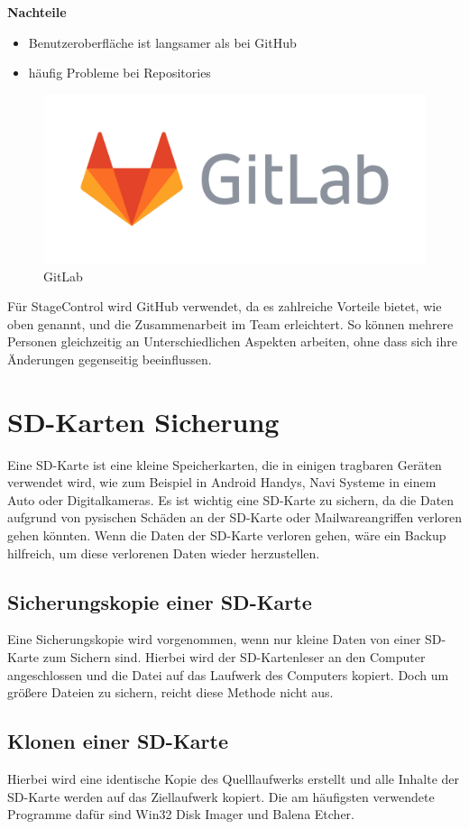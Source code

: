 \textbf{Nachteile}
\begin{itemize}
	\item Benutzeroberfläche ist langsamer als bei GitHub
	\item häufig Probleme bei Repositories 
\end{itemize}


\begin{figure}[H]
	\centering
	\includegraphics[width=0.5\linewidth]{images/GitLab.png}
	\caption[GitLab]{GitLab}
	\label{fig:GitLab}
\end{figure}

Für StageControl wird GitHub verwendet, da es zahlreiche Vorteile bietet, wie oben genannt, und die Zusammenarbeit im Team erleichtert. So können mehrere Personen gleichzeitig an Unterschiedlichen Aspekten arbeiten, ohne dass sich ihre Änderungen gegenseitig beeinflussen.

\section{SD-Karten Sicherung}
Eine SD-Karte ist eine kleine Speicherkarten, die in einigen tragbaren Geräten verwendet wird, wie zum Beispiel in Android Handys, Navi Systeme in einem Auto oder Digitalkameras. Es ist wichtig eine SD-Karte zu sichern, da die Daten aufgrund von pysischen Schäden an der SD-Karte oder Mailwareangriffen verloren gehen könnten. Wenn die Daten der SD-Karte verloren gehen, wäre ein Backup hilfreich, um diese verlorenen Daten wieder herzustellen.  \parencite{SD-KartenSicherung}

\subsection{Sicherungskopie einer SD-Karte}
Eine Sicherungskopie wird vorgenommen, wenn nur kleine Daten von einer SD-Karte zum Sichern sind. Hierbei wird der SD-Kartenleser an den Computer angeschlossen und die Datei auf das Laufwerk des Computers kopiert. Doch um größere Dateien zu sichern, reicht diese Methode nicht aus. \parencite{SD-KartenSicherung}

\subsection{Klonen einer SD-Karte}
 Hierbei wird eine identische Kopie des Quelllaufwerks erstellt und alle Inhalte der SD-Karte werden auf das Ziellaufwerk kopiert. Die am häufigsten verwendete Programme dafür sind Win32 Disk Imager und Balena Etcher. \parencite{SD-KartenSicherung}

